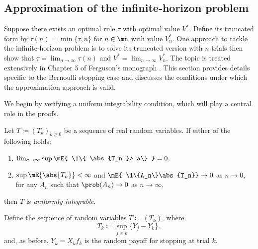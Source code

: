 \documentclass[11pt]{article}
\begin{document}
\subsection{Approximation of the infinite-horizon problem}
%
Suppose  there exists an optimal rule $\tau$  with optimal value  $V^*$.  Define its truncated form by  $\tau(n)=\min \{\tau, n\}$ for $n \in \mn$ with value $V^*_n$. One approach to tackle the infinite-horizon problem is to solve its truncated version  with $n$ trials then show that $\tau = \lim_{n \to \infty} \tau(n)$ and  $V^* = \lim_{n \to \infty} V^*_n$.   The topic is treated extensively in Chapter 5 of Ferguson's monograph \cite{FergusonBook}. This section provides details specific to the Bernoulli stopping case and discusses the conditions under which the approximation approach is valid.

We begin by verifying a uniform integrability condition, which will play a central role in the proofs.
  \begin{define}
	Let  $T \coloneqq (T_k)_{k\ge 0}$ be a sequence of real random variables. If either of the following  holds:
	\begin{enumerate}
		\item $\lim_{a \to \infty} \sup \mE{ \1\{ \abs{T_n }> a\} } = 0,$
		\item $\sup \mE{ \abs{T_n}} < \infty$ and  $\mE{ \1\{A_n\}\abs{T_n}} \to 0$ as $n \to 0$, for  any $A_n$ such that $\prob(A_n) \to 0$ as $n \to \infty$,
	\end{enumerate}
	then $T$ is \textit{uniformly integrable}.
\end{define}
Define the sequence of random variables $T \coloneqq (T_k)$, where
\begin{equation}\label{def.T}
	T_k \coloneqq \sup_{j \ge k} \{ Y_j - Y_k\},
\end{equation}
and, as before, $Y_k=X_kf_k$ is the random payoff for stopping at trial $k$.
\end{document}

